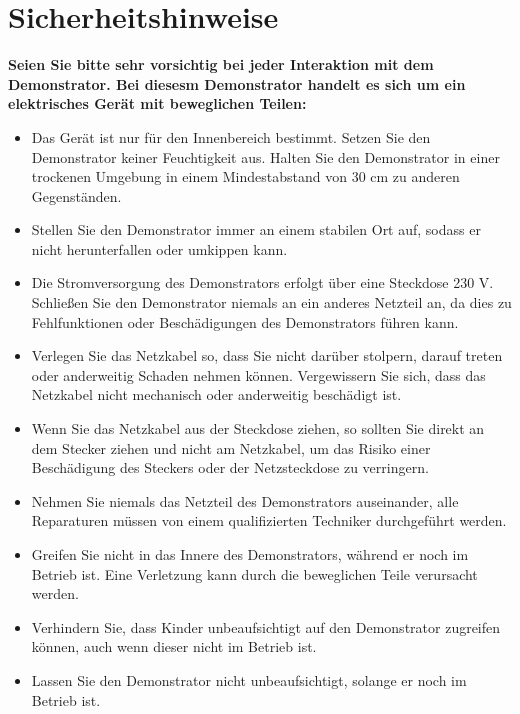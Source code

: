 \documentclass[a4paper,12pt]{report}
\begin{document}
	\setcounter{page}{-1}  
	
	
	\tableofcontents
	\listoffigures
	\listoftables
	
	\cleardoublepage         
	\setcounter{page}{1} 
	
	
	\chapter{Sicherheitshinweise}
			\textbf{Seien Sie bitte sehr vorsichtig bei jeder Interaktion mit dem Demonstrator. Bei diesesm Demonstrator handelt es sich um ein elektrisches Gerät mit beweglichen Teilen:}
	\begin{itemize}[leftmargin=1.5em]

		
		\item Das Gerät ist nur für den Innenbereich bestimmt. Setzen Sie den Demonstrator keiner Feuchtigkeit aus.
		Halten Sie den Demonstrator in einer trockenen Umgebung in einem Mindestabstand von 30 cm zu anderen
		Gegenständen.
		
		\item Stellen Sie den Demonstrator immer an einem stabilen Ort auf, sodass er nicht herunterfallen oder umkippen kann.
		
		\item Die Stromversorgung des Demonstrators erfolgt über eine Steckdose 230 V. Schließen Sie den Demonstrator niemals an ein anderes Netzteil an, da dies zu Fehlfunktionen oder Beschädigungen des Demonstrators führen kann.
		
		\item Verlegen Sie das Netzkabel so, dass Sie nicht darüber stolpern, darauf treten oder anderweitig Schaden nehmen	können. Vergewissern Sie sich, dass das Netzkabel nicht mechanisch oder anderweitig beschädigt ist.
		
		\item Wenn Sie das Netzkabel aus der Steckdose ziehen, so sollten Sie direkt an dem Stecker ziehen und nicht am	Netzkabel, um das Risiko einer Beschädigung des Steckers oder der Netzsteckdose zu verringern.
		
		\item Nehmen Sie niemals das Netzteil des Demonstrators auseinander, alle Reparaturen müssen von einem qualifizierten Techniker durchgeführt werden.
		
		\item Greifen Sie nicht in das Innere des Demonstrators, während er noch im Betrieb ist. Eine Verletzung kann durch die beweglichen Teile verursacht werden.
		
		\item Verhindern Sie, dass Kinder unbeaufsichtigt auf den Demonstrator zugreifen können, auch wenn dieser nicht im Betrieb ist.
		
		\item Lassen Sie den Demonstrator nicht unbeaufsichtigt, solange er noch im Betrieb ist.
	\end{itemize}
	
\end{document}
